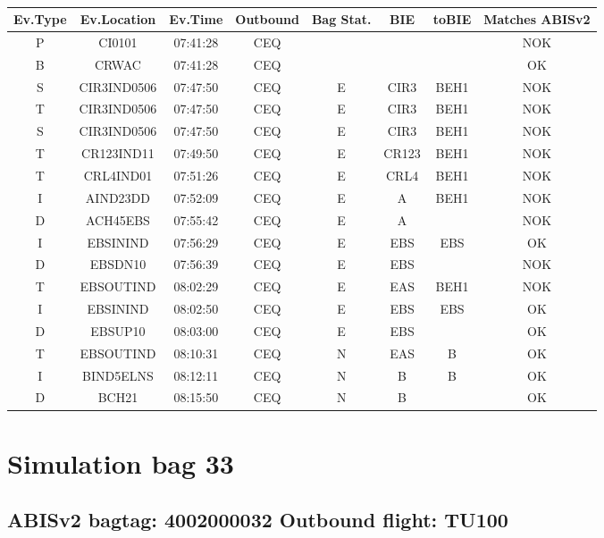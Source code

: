 \documentclass{report}
\begin{document}
\paragraph{}
\begin{longtable}{cccccccc}    \toprule
\rowcolor{white!50}
\textbf{Ev.Type} & \textbf{Ev.Location} & \textbf{Ev.Time} & \textbf{Outbound} & \textbf{Bag Stat.} & \textbf{BIE} & \textbf{toBIE} & \textbf{Matches ABISv2} \\\midrule
P & CI0101 & 07:41:28  & CEQ &  &  &  & NOK\\
B & CRWAC & 07:41:28  & CEQ &  &  &  & OK\\
S & CIR3IND0506 & 07:47:50  & CEQ & E & CIR3 & BEH1 & NOK\\
T & CIR3IND0506 & 07:47:50  & CEQ & E & CIR3 & BEH1 & NOK\\
S & CIR3IND0506 & 07:47:50  & CEQ & E & CIR3 & BEH1 & NOK\\
T & CR123IND11 & 07:49:50  & CEQ & E & CR123 & BEH1 & NOK\\
T & CRL4IND01 & 07:51:26  & CEQ & E & CRL4 & BEH1 & NOK\\
I & AIND23DD & 07:52:09  & CEQ & E & A & BEH1 & NOK\\
D & ACH45EBS & 07:55:42  & CEQ & E & A &  & NOK\\
I & EBSININD & 07:56:29  & CEQ & E & EBS & EBS & OK\\
D & EBSDN10 & 07:56:39  & CEQ & E & EBS &  & NOK\\
T & EBSOUTIND & 08:02:29  & CEQ & E & EAS & BEH1 & NOK\\
I & EBSININD & 08:02:50  & CEQ & E & EBS & EBS & OK\\
D & EBSUP10 & 08:03:00  & CEQ & E & EBS &  & OK\\
T & EBSOUTIND & 08:10:31  & CEQ & N & EAS & B & OK\\
I & BIND5ELNS & 08:12:11  & CEQ & N & B & B & OK\\
D & BCH21 & 08:15:50  & CEQ & N & B &  & OK\\
\bottomrule
\end{longtable}
\pagebreak
\section*{Simulation bag 33}
\subsection*{ABISv2 bagtag: 4002000032 Outbound flight: TU100}
\end{document}
